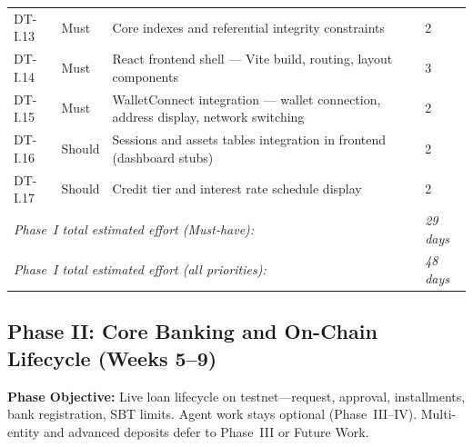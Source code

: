 \documentclass[12pt, a4paper]{report}
\begin{document}
\begin{table}[H]
\begin{tabular}{p{1.8cm}p{1.8cm}p{7.5cm}p{1.5cm}}
DT-I.13 & Must & Core indexes and referential integrity constraints & 2 \\
DT-I.14 & Must & React frontend shell --- Vite build, routing, layout components & 3 \\
DT-I.15 & Must & WalletConnect integration --- wallet connection, address display, network switching & 2 \\
DT-I.16 & Should & Sessions and assets tables integration in frontend (dashboard stubs) & 2 \\
DT-I.17 & Should & Credit tier and interest rate schedule display & 2 \\
\multicolumn{3}{l}{\textit{Phase~I total estimated effort (Must-have):}} & \textit{29 days} \\
\multicolumn{3}{l}{\textit{Phase~I total estimated effort (all priorities):}} & \textit{48 days} \\
\bottomrule
\end{tabular}
\end{table}

\vspace{2pt}

\subsection{Phase II: Core Banking and On-Chain Lifecycle (Weeks 5--9)}

\textbf{Phase Objective:} Live loan lifecycle on testnet---request, approval, installments, bank registration, SBT limits. Agent work stays optional (Phase~III--IV). Multi-entity and advanced deposits defer to Phase~III or Future Work.
\end{document}
